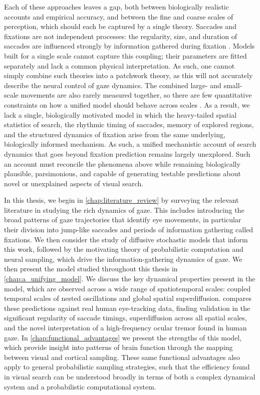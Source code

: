 Each of these approaches leaves a gap, both between biologically realistic accounts and empirical accuracy, and between the fine and coarse scales of perception, which should each be captured by a single theory. Saccades and fixations are not independent processes: the regularity, size, and duration of saccades are influenced strongly by information gathered during fixation \cite{erkelens_coordination_2006, collewijn_significance_2008, ROBINSON2022329}. Models built for a single scale cannot capture this coupling; their parameters are fitted separately and lack a common physical interpretation. As such, one cannot simply combine such theories into a patchwork theory, as this will not accurately describe the neural control of gaze dynamics. The combined large- and small-scale movements are also rarely measured together, so there are few quantitative constraints on how a unified model should behave across scales \cite{naher_primate_saccades}. As a result, we lack a single, biologically motivated model in which the heavy-tailed spatial statistics of search, the rhythmic timing of saccades, memory of explored regions, and the structured dynamics of fixation arise from the same underlying, biologically informed mechanism. As such, a unified mechanistic account of search dynamics that goes beyond fixation prediction remains largely unexplored. Such an account must reconcile the phenomena above while remaining biologically plausible, parsimonious, and capable of generating testable predictions about novel or unexplained aspects of visual search.

In this thesis, we begin in \cref{chap:literature_review} by surveying the relevant literature in studying the rich dynamics of gaze. This includes introducing the broad patterns of gaze trajectories that identify eye movements, in particular their division into jump-like saccades and periods of information gathering called fixations. We then consider the study of diffusive stochastic models that inform this work, followed by the motivating theory of probabilistic computation and neural sampling, which drive the information-gathering dynamics of gaze. We then present the model studied throughout this thesis in \cref{chap:a_unifying_model}. We discuss the key dynamical properties present in the model, which are observed across a wide range of spatiotemporal scales: coupled temporal scales of nested oscillations and global spatial superdiffusion.  compares these predictions against real human eye-tracking data, finding validation in the significant regularity of saccade timings, superdiffusion across all spatial scales, and the novel interpretation of a high-frequency ocular tremor found in human gaze. In \cref{chap:functional_advantages} we present the strengths of this model, which provide insight into patterns of brain function through the mapping between visual and cortical sampling. These same functional advantages also apply to general probabilistic sampling strategies, such that the efficiency found in visual search can be understood broadly in terms of both a complex dynamical system and a probabilistic computational system. 